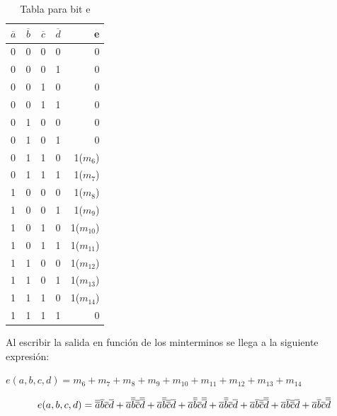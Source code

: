 \documentclass{article}
\begin{document}
			\begin{table}[h!]
			\begin{center}
				\caption{Tabla para bit e}
				\begin{tabular}{l|c|c|c|r}
				\textbf{$\overline{a}$} & \textbf{$\overline{b}$} & \textbf{$\overline{c}$} & \textbf{$\overline{d}$} & \textbf{e}\\
				\hline
				0 & 0 & 0 & 0 & 0\\
				0 & 0 & 0 & 1 & 0\\	
				0 & 0 & 1 & 0 & 0\\
				0 & 0 & 1 & 1 & 0\\
				0 & 1 & 0 & 0 & 0\\
				0 & 1 & 0 & 1 & 0\\	
				0 & 1 & 1 & 0 & 1($m_{6}$)\\
				0 & 1 & 1 & 1 & 1($m_{7}$)\\		
				1 & 0 & 0 & 0 & 1($m_{8}$)\\
				1 & 0 & 0 & 1 & 1($m_{9}$)\\	
				1 & 0 & 1 & 0 & 1($m_{10}$)\\
				1 & 0 & 1 & 1 & 1($m_{11}$)\\
				1 & 1 & 0 & 0 & 1($m_{12}$)\\
				1 & 1 & 0 & 1 & 1($m_{13}$)\\	
				1 & 1 & 1 & 0 & 1($m_{14}$)\\
				1 & 1 & 1 & 1 & 0\\			
				\end{tabular}
			\end{center}
		\end{table}
		\newline Al escribir la salida en función de los minterminos se llega a la siguiente expresión:
		\newline \centerline{$e(a,b,c,d)=m_{6}+m_{7}+m_{8}+m_{9}+m_{10}+m_{11}+m_{12}+m_{13}+m_{14}$}
		\begin{equation}
			\centerline{$e(a,b,c,d)=\overline{\overline{a}}\overline{b}\overline{c}\overline{d}+\overline{a}\overline{\overline{b}}\overline{\overline{c}}\overline{\overline{d}}+\overline{a}\overline{\overline{b}}\overline{\overline{c}}\overline{d}+\overline{a}\overline{\overline{b}}\overline{c}\overline{\overline{d}}+\overline{a}\overline{\overline{b}}\overline{c}\overline{d}+\overline{a}\overline{b}\overline{\overline{c}}\overline{\overline{d}}+\overline{a}\overline{b}\overline{\overline{c}}\overline{d}+\overline{a}\overline{b}\overline{c}\overline{\overline{d}}$}
		\end{equation}
\end{document}
